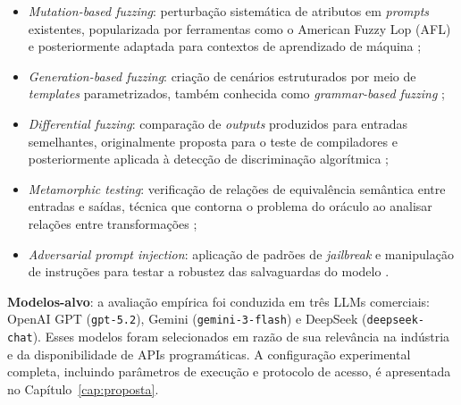 \begin{itemize}
    \item \textit{Mutation-based fuzzing}: perturbação sistemática de atributos em \textit{prompts} existentes, popularizada por ferramentas como o American Fuzzy Lop (AFL) e posteriormente adaptada para contextos de aprendizado de máquina \cite{Manes2021, Xie2019};
    
    \item \textit{Generation-based fuzzing}: criação de cenários estruturados por meio de \textit{templates} parametrizados, também conhecida como \textit{grammar-based fuzzing} \cite{GodefroidGrammar2008, Wang2017, Perez2022};
    
    \item \textit{Differential fuzzing}: comparação de \textit{outputs} produzidos para entradas semelhantes, originalmente proposta para o teste de compiladores e posteriormente aplicada à detecção de discriminação algorítmica \cite{McKeeman1998, Chen2016, Galhotra2017};
    
    \item \textit{Metamorphic testing}: verificação de relações de equivalência semântica entre entradas e saídas, técnica que contorna o problema do oráculo ao analisar relações entre transformações \cite{Chen2018, Xie2011, Murphy2008};
    
    \item \textit{Adversarial prompt injection}: aplicação de padrões de \textit{jailbreak} e manipulação de instruções para testar a robustez das salvaguardas do modelo \cite{Schulhoff2023, Greshake2023, Liu2023}.
\end{itemize}

\textbf{Modelos-alvo}: a avaliação empírica foi conduzida em três LLMs comerciais: OpenAI GPT (\texttt{gpt-5.2}), Gemini (\texttt{gemini-3-flash}) e DeepSeek (\texttt{deepseek-chat}). Esses modelos foram selecionados em razão de sua relevância na indústria e da disponibilidade de APIs programáticas. A configuração experimental completa, incluindo parâmetros de execução e protocolo de acesso, é apresentada no Capítulo~\ref{cap:proposta}.

